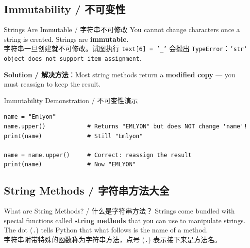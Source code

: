 \documentclass[11pt,a4paper]{report}
\let\oldtexttt\texttt
\renewcommand{\texttt}[1]{\textcolor{mainblue}{\oldtexttt{#1}}}
\begin{document}
\subsection{Immutability / 不可变性}

\begin{warning}{Strings Are Immutable / 字符串不可修改}
    You cannot change characters once a string is created. Strings are \textbf{immutable}. \\
    字符串一旦创建就不可修改。试图执行 \texttt{text[6] = '\_'} 会抛出 \texttt{TypeError}：\texttt{'str' object does not support item assignment}.

    \textbf{Solution / 解决方法}：Most string methods return a \textbf{modified copy} — you must reassign to keep the result.
\end{warning}

\begin{examplebox}{Immutability Demonstration / 不可变性演示}
\begin{lstlisting}
name = "Emlyon"
name.upper()            # Returns "EMLYON" but does NOT change 'name'!
print(name)             # Still "Emlyon"

name = name.upper()     # Correct: reassign the result
print(name)             # Now "EMLYON"
\end{lstlisting}
\end{examplebox}

\subsection{String Methods / 字符串方法大全}

\begin{concept}{What are String Methods? / 什么是字符串方法？}
    Strings come bundled with special functions called \textbf{string methods} that you can use to manipulate strings. The dot (\texttt{.}) tells Python that what follows is the name of a method. \\
    字符串附带特殊的函数称为字符串方法，点号 (\texttt{.}) 表示接下来是方法名。
\end{concept}
\end{document}
